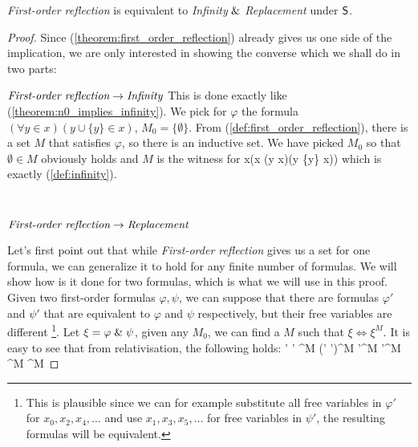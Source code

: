 \begin{theorem}\label{theorem:levy_equivalence_contemporary}
\emph{First-order reflection} is equivalent to \emph{Infinity} $ \mathrel{\&} $ \emph{Replacement} under $\sf{S}$.
\end{theorem}
\begin{proof}
Since (\ref{theorem:first_order_reflection}) already gives us one side of the implication, we are only interested in showing the converse which we shall do in two parts:

$\bold{\emph{First-order reflection} \rightarrow \emph{Infinity}}$
This is done exactly like (\ref{theorem:n0_implies_infinity}). We pick for $\varphi$ the formula $(\forall y \in x)(y \cup \{y\} \in x)$, $M_0 = \{\emptyset\}$. From (\ref{def:first_order_reflection}), there is a set $M$ that satisfies $\varphi$, so there is an inductive set. We have picked $M_0$ so that $\emptyset \in M$ obviously holds and $M$ is the witness for 
\beq
\exists x(\emptyset \in x \et (\forall y \in x)(y \cup \{y\} \in x))
\eeq
which is exactly (\ref{def:infinity}).

\

$\bold{\emph{First-order reflection} \rightarrow \emph{Replacement}}$


Let's first point out that while \emph{First-order reflection} gives us a set for one formula, we can generalize it to hold for any finite number of formulas. We will show how is it done for two formulas, which is what we will use in this proof. Given two first-order formulas $\varphi, \psi$, we can suppose that there are formulas $\varphi'$ and $\psi'$ that are equivalent to $\varphi$ and $\psi$ respectively, but their free variables are different \footnote{This is plausible since we can for example substitute all free variables in $\varphi'$ for $x_0, x_2, x_4, \ldots$ and use $x_1, x_3, x_5, \ldots$ for free variables in $\psi'$, the resulting formulas will be equivalent.}. Let $\xi = \varphi \mathrel{\&} \psi$, given any $M_0$, we can find a $M$ such that $\xi \iff \xi^M$. It is easy to see that from relativisation, the following holds:
\beq
\varphi \et \psi \iff \varphi' \et \psi' \iff \xi \iff \xi^M \iff (\varphi' \et \psi')^M \iff \varphi'^M \et \psi'^M \iff \varphi^M \et \psi^M
\eeq


\end{proof}
